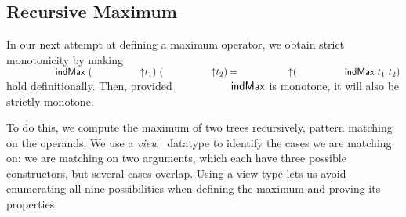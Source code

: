 



\subsection{Recursive Maximum}

In our next attempt at defining a maximum operator, we
obtain strict monotonicity by making $\indMax\ (\up t_1) \ (\up t_2) = \up (\indMax\ t_1\ t_2)$
hold definitionally. Then, provided $\indMax$ is monotone, it will also be
strictly monotone.

To do this, we compute the maximum of two trees recursively,
pattern matching on the operands. We use a \textit{view}~\citep{TODO}
datatype to identify the cases we are matching on: we are matching on two arguments,
which each have three possible constructors, but several cases overlap.
Using a view type lets us avoid enumerating all nine possibilities when defining
the maximum and proving its properties.

\begin{code}[hide]%
%
\>[2]\AgdaSpace{}%
\AgdaSpace{}%
\AgdaSpace{}%
\AgdaSpace{}%
\AgdaSymbol{(}\AgdaSpace{}%
\AgdaSymbol{;}\AgdaSpace{}%
\AgdaOperator{\AgdaFunction{\AgdaUnderscore{}<\AgdaUnderscore{}}}\AgdaSymbol{)}\<%
\\
%
\>[2]\AgdaSpace{}%
\AgdaSpace{}%
\<%
\\
%
\>[2]\AgdaSpace{}%
\AgdaSpace{}%
\<%
\\
%
\>[2]\AgdaSpace{}%
\AgdaSpace{}%
\<%
\\
%
\>[2]\AgdaSpace{}%
\AgdaSpace{}%
\<%
\end{code}

